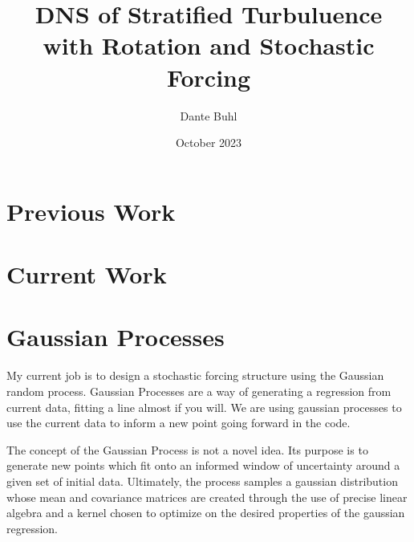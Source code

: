 \documentclass{article}
\title{DNS of Stratified Turbuluence with Rotation and Stochastic Forcing}
\author{Dante Buhl}
\date{October 2023}
\begin{document}
\newcommand{\bs}[1]{\boldsymbol{#1}}
\newcommand{\bmp}[1]{\begin{minipage}{#1\textwidth}}
\newcommand{\emp}{\end{minipage}}
\newcommand{\R}{\mathbb{R}}
\newcommand{\K}{\bs{\mathrm{K}}}
\newcommand{\m}{\bs{\mu}_*}
\newcommand{\s}{\bs{\Sigma}_*}

\maketitle

\section{Previous Work}


\section{Current Work}


\section{Gaussian Processes}
\begin{comment}
 \left[\begin{array}{c c c c c}
    0 & \cdots & 0& \cdots& 0 \\
    \vdots & 0 & 0 & \cdots & 0 \\
    0 & 0 & \lambda_{n_c} & 0 & \vdots \\
    \vdots & \vdots & 0 & \ddots & 0 \\
    0 & 0 & \cdots & 0 & \lambda_{n}
    \end{array}\right]    
\end{comment}

My current job is to design a stochastic forcing structure using the Gaussian random process. Gaussian Processes are a way of generating a regression from current data, fitting a line almost if you will. We are using gaussian processes to use the current data to inform a new point going forward in the code. 

The concept of the Gaussian Process is not a novel idea. Its purpose is to generate new points which fit onto an informed window of uncertainty around a given set of initial data. Ultimately, the process samples a gaussian distribution whose mean and covariance matrices are created through the use of precise linear algebra and a kernel chosen to optimize on the desired properties of the gaussian regression. 
\end{document}
